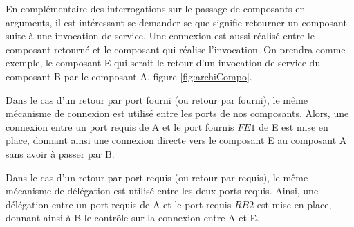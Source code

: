       En complémentaire des interrogations sur le passage de composants en arguments, il est intéressant se demander se que signifie retourner un composant suite à une invocation de service. Une connexion est aussi réalisé entre le composant retourné et le composant qui réalise l'invocation. On prendra comme exemple, le composant E qui serait le retour d'un invocation de service du composant B par le composant A, figure \ref{fig:archiCompo}.
  
      Dans le cas d'un retour par port fourni (ou retour par fourni), le même mécanisme de connexion est utilisé entre les ports de nos composants. Alors, une connexion entre un port requis de A et le port fournis $FE1$ de E est mise en place, donnant ainsi une connexion directe vers le composant E au composant A sans avoir à passer par B. 
  
      Dans le cas d'un retour par port requis (ou retour par requis), le même mécanisme de délégation est utilisé entre les deux ports requis. Ainsi, une délégation entre un port requis de A et le port requis $RB2$ est mise en place, donnant ainsi à B le contrôle sur la connexion entre A et E.
    
         
